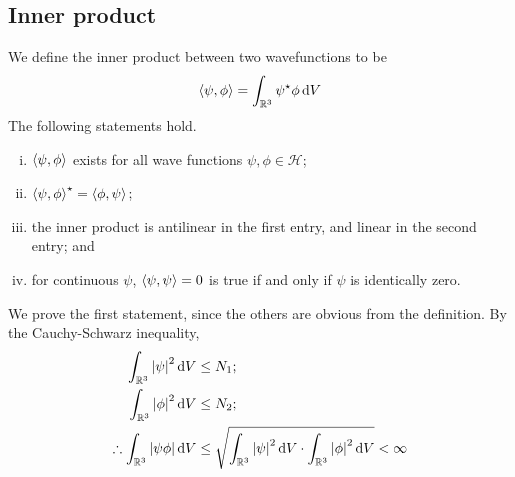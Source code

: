 \subsection{Inner product}
We define the inner product between two wavefunctions to be
\[
	\left\langle{\psi,\phi}\right\rangle = \int_{\mathbb R^3} \psi^\star \phi \dd{V}
\]
The following statements hold.
\begin{enumerate}[(i)]
	\item \( \left\langle{\psi, \phi}\right\rangle \) exists for all wave functions \( \psi, \phi \in \mathcal H \);
	\item \( \left\langle{\psi, \phi}\right\rangle^\star = \left\langle{\phi, \psi}\right\rangle \);
	\item the inner product is antilinear in the first entry, and linear in the second entry; and
	\item for continuous \( \psi \), \( \left\langle{\psi, \psi}\right\rangle = 0 \) is true if and only if \( \psi \) is identically zero.
\end{enumerate}
We prove the first statement, since the others are obvious from the definition.
By the Cauchy-Schwarz inequality,
\begin{align*}
	\int_{\mathbb R^3} \abs{\psi}^2 \dd{V}               & \leq N_1;                                                                                                \\
	\int_{\mathbb R^3} \abs{\phi}^2 \dd{V}               & \leq N_2;                                                                                                \\
	\therefore \int_{\mathbb R^3} \abs{\psi \phi} \dd{V} & \leq \sqrt{\int_{\mathbb R^3} \abs{\psi}^2 \dd{V} \cdot \int_{\mathbb R^3} \abs{\phi}^2 \dd{V}} < \infty \\
\end{align*}

